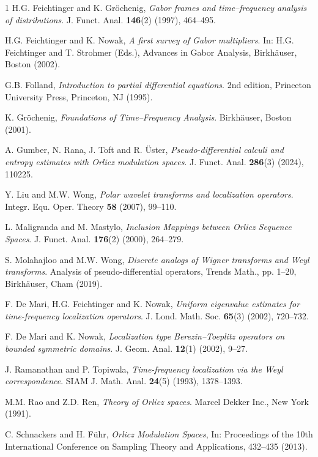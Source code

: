 \documentclass[a4paper,11pt, reqno]{amsart}
\theoremstyle{plain}
\theoremstyle{definition}
\theoremstyle{remark}
\begin{document}
\begin{thebibliography}{1}
H.G. Feichtinger and K. Gr\"ochenig, {\it Gabor frames and time--frequency analysis of distributions}. J. Funct. Anal. \textbf{146}(2) (1997), 464--495.

H.G. Feichtinger and K. Nowak, {\it A first survey of Gabor multipliers}. In: H.G. Feichtinger and T. Strohmer (Eds.), Advances in Gabor Analysis, Birkh\"auser, Boston (2002).

G.B. Folland, {\it Introduction to partial differential equations}. 2nd edition, Princeton University Press, Princeton, NJ (1995).

K. Gr\"ochenig, {\it Foundations of Time--Frequency Analysis}. Birkh\"auser, Boston (2001).

A. Gumber, N. Rana, J. Toft and R. \"Uster, {\it Pseudo-differential calculi and entropy estimates with Orlicz modulation spaces}. J. Funct. Anal. \textbf{286}(3) (2024), 110225.

Y. Liu and M.W. Wong, {\it Polar wavelet transforms and
localization operators}. Integr. Equ. Oper. Theory \textbf{58} (2007), 99--110.

L. Maligranda and M. Mastylo, {\it Inclusion Mappings between Orlicz Sequence Spaces}. J. Funct. Anal. \textbf{176}(2) (2000), 264--279.

S. Molahajloo and M.W. Wong, {\it Discrete analogs of Wigner transforms and Weyl transforms}. Analysis of pseudo-differential operators, Trends Math., pp. 1--20, Birkh\"auser, Cham (2019).

F. De Mari, H.G. Feichtinger and K. Nowak, {\it Uniform eigenvalue estimates for time-frequency localization operators}. J. Lond. Math. Soc. \textbf{65}(3) (2002), 720--732.

F. De Mari and K. Nowak, {\it Localization type Berezin--Toeplitz operators on bounded symmetric domains}. J. Geom. Anal. \textbf{12}(1) (2002), 9--27.

J. Ramanathan and P. Topiwala, {\it Time-frequency localization via the Weyl correspondence}. SIAM J. Math. Anal. \textbf{24}(5) (1993), 1378--1393.

M.M. Rao and Z.D. Ren, {\it Theory of Orlicz spaces}. Marcel Dekker Inc., New York (1991).

C. Schnackers and H. F\"uhr, {\it Orlicz Modulation Spaces}, In: Proceedings of the 10th International Conference on Sampling Theory and Applications, 432--435 (2013).


\end{thebibliography}
\end{document}
